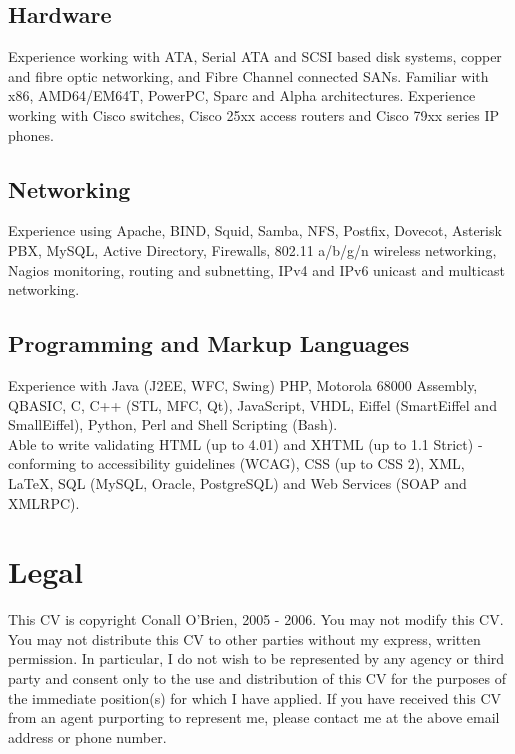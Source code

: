 \documentclass[a4paper, 11pt] {article}
\begin{document}
\subsection*{Hardware}

Experience working with ATA, Serial ATA and SCSI based disk systems, 
copper and fibre optic networking, and Fibre Channel connected SANs. 
Familiar with x86, AMD64/EM64T, PowerPC, Sparc and Alpha architectures. 
Experience working with Cisco switches, Cisco 25xx access routers and 
Cisco 79xx series IP phones.

\subsection*{Networking}

Experience using Apache, BIND, Squid, Samba, NFS, Postfix, Dovecot,
Asterisk PBX, MySQL, Active  Directory, Firewalls, 802.11 a/b/g/n wireless 
networking, Nagios monitoring, routing and subnetting, IPv4 and IPv6 
unicast and multicast networking.
 

\subsection*{Programming and Markup Languages}

Experience with Java (J2EE, WFC, Swing) PHP, Motorola 68000 Assembly, QBASIC,
C, C++ (STL, MFC, Qt), JavaScript, VHDL, Eiffel (SmartEiffel and 
SmallEiffel), Python, Perl and Shell Scripting (Bash). \\

Able to write validating HTML (up to 4.01) and XHTML (up 
to 1.1 Strict) - conforming to accessibility guidelines (WCAG), CSS (up to 
CSS 2), XML, LaTeX, SQL (MySQL, Oracle, PostgreSQL) and Web Services 
(SOAP and XMLRPC).

\section*{Legal}

This CV is copyright Conall O'Brien, 2005 - 2006. You may not modify 
this CV. You may not distribute this CV to other parties without my 
express, written permission. In particular, I do not wish to be 
represented by any agency or third party and consent only to the use 
and distribution of this CV for the purposes of the immediate 
position(s) for which I have applied. If you have received this CV from 
an agent purporting to represent me, please contact me at the above 
email address or phone number.
\end{document}
